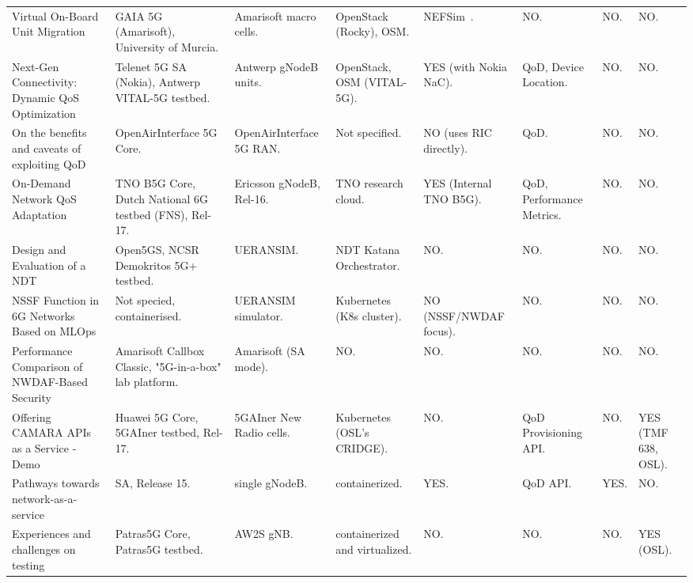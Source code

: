\begin{table}[ht]
\begin{tabular}{p{2cm} p{2cm} p{2cm} p{2cm} p{1.4cm} p{1.4cm} p{1.4cm} p{1.4cm}}
Virtual On-Board Unit Migration~\cite{VirtualOnBoardUnitMigration} & GAIA \acs{5G} (Amarisoft), University of Murcia. & Amarisoft macro cells. & OpenStack (Rocky), \acs{OSM}. & NEFSim~\cite{NEFSimMediaNetLabGithub}. & NO. & NO. & NO. \\
Next-Gen Connectivity: Dynamic \acs{QoS} Optimization~\cite{NextGenConnectivityDynamicQoS} & Telenet \acs{5G} \acs{SA} (Nokia), Antwerp VITAL-5G testbed. & Antwerp gNodeB units. & OpenStack, \acs{OSM} (VITAL-5G). & YES (with Nokia \acs{NaC}). & \acs{QoD}, Device Location. & NO. & NO. \\
On the benefits and caveats of exploiting \acs{QoD}~\cite{BenefitsCaveatsQoDNetworkAPIsVideoStreaming} & OpenAirInterface \acs{5G} Core. & OpenAirInterface \acs{5G} \acs{RAN}. & Not specified. & NO (uses \acs{RIC} directly). & \acs{QoD}. & NO. & NO. \\
On-Demand Network QoS Adaptation~\cite{OnDemandNetworkQoSAdaptation} & TNO \acs{B5G} Core, Dutch National \acs{6G} testbed (FNS), Rel-17. & Ericsson gNodeB, Rel-16. & TNO research cloud. & YES (Internal TNO \acs{B5G}). & \acs{QoD}, Performance Metrics. & NO. & NO. \\
Design and Evaluation of a \acs{NDT}~\cite{DesignAndEvaluationNetworkDigitalTwin} & Open5GS, NCSR Demokritos \acs{5G}+ testbed. & UERANSIM. & \acs{NDT} Katana Orchestrator. & NO. & NO. & NO. & NO. \\
\acs{NSSF} Function in \acs{6G} Networks Based on MLOps~\cite{NSSFfunction6GNetworksMLOPS} & Not specied, containerised. & UERANSIM simulator. & Kubernetes (K8s cluster). & NO (NSSF/NWDAF focus). & NO. & NO. & NO. \\
Performance Comparison of NWDAF-Based Security~\cite{PerformanceComparisonNWDAFSecurity} & Amarisoft Callbox Classic, "\acs{5G}-in-a-box" lab platform. & Amarisoft (\acs{SA} mode). & NO. & NO. & NO. & NO. & NO. \\
Offering CAMARA APIs as a Service - Demo~\cite{CAMARAaaSdemo} & Huawei \acs{5G} Core, 5GAIner testbed, Rel-17. & 5GAIner New Radio cells. & Kubernetes (\acs{OSL}'s CRIDGE). & NO. & \acs{QoD} Provisioning \acs{API}. & NO. & YES (\acs{TMF} 638, \acs{OSL}). \\
Pathways towards network-as-a-service~\cite{PathwayNaaSCAMARA} & \acs{SA}, Release 15. & single gNodeB. & containerized. & YES. & \acs{QoD} \acs{API}. & YES. & NO. \\
Experiences and challenges on testing~\cite{ExperiencesChallengesTestingValidatingNetworkAware} & Patras5G Core, Patras5G testbed. & AW2S \acs{gNB}. & containerized and virtualized. & NO. & NO. & NO. & YES (\acs{OSL}). \\

\end{tabular}
\end{table}
